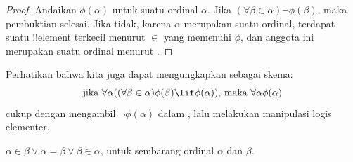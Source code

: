 \documentclass[../../../include/open-logic-section]{subfiles}
\begin{document}
\begin{proof}
Andaikan $\phi(\alpha)$ untuk suatu ordinal $\alpha$. Jika $(\forall \beta
\in \alpha) \lnot \phi(\beta)$, maka pembuktian selesai. Jika tidak, karena
$\alpha$ merupakan suatu ordinal, terdapat suatu !!{element} terkecil
menurut $\in$ yang memenuhi $\phi$, dan anggota ini merupakan
suatu ordinal menurut .
\end{proof}
\noindent
Perhatikan bahwa kita juga dapat mengungkapkan 
sebagai skema:
\[
\text{jika }\forall \alpha((\forall \beta \in \alpha)\phi(\beta) \lif
\phi(\alpha))\text{, maka }\forall \alpha\phi(\alpha)
\]
cukup dengan mengambil $\lnot\phi(\alpha)$ dalam
, lalu melakukan manipulasi logis elementer.

\begin{thm}[Trikotomi]
$\alpha \in \beta \lor \alpha = \beta \lor \beta \in \alpha$, untuk
sembarang ordinal $\alpha$ dan $\beta$.
\end{thm}
\end{document}
